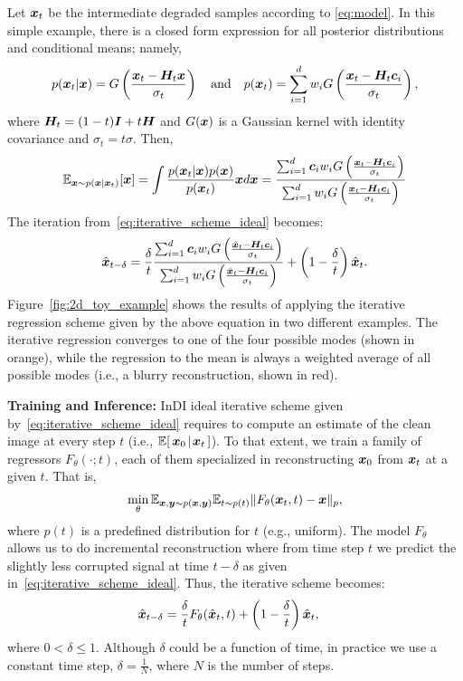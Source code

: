 \documentclass[10pt]{article} %
\begin{document}
Let ${\bm{x}}_t$ be the intermediate degraded samples according to \eqref{eq:model}. In this simple example, there is a closed form expression for all posterior distributions and conditional means; namely,
\begin{align}
    p({\bm{x}}_t | {\bm{x}}) = G\left(\frac{{\bm{x}}_t - {\bm{H}}_t {\bm{x}}}{\sigma_t}\right) \quad \text{and} \quad
    p({\bm{x}}_t) = \sum_{i=1}^d w_i G\left(\frac{{\bm{x}}_t - {\bm{H}}_t {\bm{c}}_i}{\sigma_t}\right),
\end{align}
where ${\bm{H}}_t = (1-t){\bm{I}} + t{\bm{H}}$ and $G({\bm{x}})$ is a Gaussian kernel with identity covariance and $\sigma_t = t \sigma$. Then,
$$
\mathbb{E}_{{\bm{x}} \sim p({\bm{x}} | {\bm{x}}_t)}[{\bm{x}}] = \int \frac{p({\bm{x}}_t | {\bm{x}}) p ({\bm{x}}) }{p({\bm{x}}_t)} {\bm{x}} d{\bm{x}}=
\frac{\sum_{i=1}^d {\bm{c}}_i w_i G\left(\frac{{\bm{x}}_t - {\bm{H}}_t{\bm{c}}_i}{\sigma_t}\right)}{\sum_{i=1}^d w_i G\left(\frac{{\bm{x}}_t - {\bm{H}}_t{\bm{c}}_i}{\sigma_t}\right)}
$$
The iteration from~\eqref{eq:iterative_scheme_ideal} becomes:
$$
\hat{{\bm{x}}}_{t-\delta} = \frac{\delta}{t} \frac{\sum_{i=1}^d {\bm{c}}_i w_i G\left(\frac{\hat {{\bm{x}}}_t - {\bm{H}}_t{\bm{c}}_i}{\sigma_t}\right)}{\sum_{i=1}^d w_i G\left(\frac{\hat {{\bm{x}}}_t - {\bm{H}}_t{\bm{c}}_i}{\sigma_t}\right)} + \left(1-\frac{\delta}{t}\right)\hat{{\bm{x}}}_t.
$$
Figure~\ref{fig:2d_toy_example} shows the results of applying the iterative regression scheme given by the above equation in two different examples. %
The iterative regression converges to one of the four possible modes (shown in orange), while the regression to the mean is always a weighted average of all possible modes (i.e., a blurry reconstruction, shown in red).




\noindent \textbf{Training and Inference:}
InDI ideal iterative scheme given by~\eqref{eq:iterative_scheme_ideal} requires to compute an estimate of the clean image at every step $t$ (i.e., $\mathbb{E}[\,{\bm{x}}_0\!\mid\!{\bm{x}}_t\,]$).
To that extent, we train a family of regressors $F_\theta(\cdot; t)$, each of them specialized in reconstructing ${\bm{x}}_0$ from ${\bm{x}}_t$ at a given $t$. That is,
\begin{align}
\min_\theta \mathbb{E}_{{\bm{x}},{\bm{y}} \sim p({\bm{x}},{\bm{y}})} \mathbb{E}_{t\sim p(t)}\| F_\theta({\bm{x}}_t,t) - {\bm{x}} \|_p,
\end{align}
where $p(t)$ is a predefined distribution for $t$ (e.g., uniform). The model $F_\theta$ allows us to do incremental reconstruction where from time step $t$ we predict the slightly less corrupted signal at time $t-\delta$ as given in~\eqref{eq:iterative_scheme_ideal}. Thus, the iterative scheme becomes:
\begin{align}
\hat {{\bm{x}}}_{t-\delta} &= \frac{\delta}{t} F_\theta(\hat {{\bm{x}}}_t, t) +  \left(1-\frac{\delta}{t} \right)\hat {{\bm{x}}}_t, 
\label{eq:baseline_sampler}
\end{align}
where $0 < \delta \le 1$. Although $\delta$ could be a function of time, in practice we use a constant time step, $\delta = \frac{1}{N}$, where $N$ is the number of steps.
\end{document}
